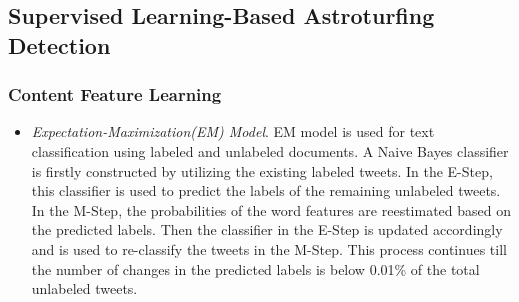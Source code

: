 \documentclass[lettersize,journal]{IEEEtran}
\begin{document}
\subsection{Supervised Learning-Based Astroturfing Detection}
\subsubsection{Content Feature Learning}
\begin{itemize}
  \item \emph{Expectation-Maximization(EM) Model}.
EM model is used for text classification using labeled and unlabeled documents. A Naive Bayes classifier is firstly constructed by utilizing the existing labeled tweets. In the E-Step, this classifier is used to predict the labels of the remaining unlabeled tweets. In the M-Step, the probabilities of the word features are reestimated based on the predicted labels. Then the classifier in the E-Step is updated accordingly and is used to re-classify the tweets in the M-Step. This process continues till the number of changes in the predicted labels is below 0.01\% of the total unlabeled tweets.
\end{itemize}

\end{document}
